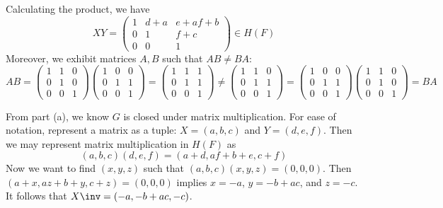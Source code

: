 \begin{solalph}
    \item Calculating the product, we have
    \[XY = 
    \begin{pmatrix}
        1 & d + a & e + af + b \\
        0 & 1 & f + c \\
        0 & 0 & 1
    \end{pmatrix} \in H(F)\]
    Moreover, we exhibit matrices $A, B$ such that $AB \neq BA$:
    \[AB =
    \begin{pmatrix}
        1 & 1 & 0 \\
        0 & 1 & 0 \\
        0 & 0 & 1
    \end{pmatrix}
    \begin{pmatrix}
        1 & 0 & 0 \\
        0 & 1 & 1 \\
        0 & 0 & 1
    \end{pmatrix} = 
    \begin{pmatrix}
        1 & 1 & 1 \\ 
        0 & 1 & 1 \\
        0 & 0 & 1
    \end{pmatrix} \neq
    \begin{pmatrix}
        1 & 1 & 0 \\
        0 & 1 & 1 \\
        0 & 0 & 1
    \end{pmatrix} = 
    \begin{pmatrix}
        1 & 0 & 0 \\
        0 & 1 & 1 \\
        0 & 0 & 1
    \end{pmatrix}
    \begin{pmatrix}
        1 & 1 & 0 \\
        0 & 1 & 0 \\
        0 & 0 & 1
    \end{pmatrix}
    = BA\]
    \item From part (a), we know $G$ is closed under matrix multiplication. For ease of notation, represent a matrix as a tuple: $X = (a, b, c)$ and $Y = (d, e, f)$. Then we may represent matrix multiplication in $H(F)$ as
    \[(a, b, c)(d, e, f) = (a + d, af + b + e, c + f)\]
    Now we want to find $(x, y, z)$ such that $(a, b, c)(x, y, z) = (0, 0, 0)$. Then $(a + x, az + b + y, c + z) = (0, 0, 0)$ implies $x = -a$, $y = -b + ac$, and $z = -c$. It follows that $X\inv = (-a, -b + ac, -c)$.

\end{solalph}
